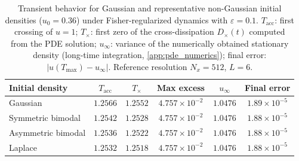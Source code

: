 \begin{table}[t]
\centering
\small
\caption{Transient behavior for Gaussian and representative non-Gaussian initial densities ($u_{0}=0.36$) under Fisher-regularized dynamics with $\varepsilon=0.1$. $T_{\mathrm{acc}}$: first crossing of $u=1$; $T_{\times}$: first zero of the cross-dissipation $D_{\times}(t)$ computed from the PDE solution; $u_{\infty}$: variance of the numerically obtained stationary density (long-time integration, \ref{app:pde_numerics}); final error: $|u(T_{\max})-u_{\infty}|$. Reference resolution $N_{x}=512$, $L=6$.}
\label{tab:nongaussian_results}
\begin{tabular}{lccccc}
\toprule
Initial density & $T_{\mathrm{acc}}$ & $T_{\times}$ & Max excess & $u_{\infty}$ & Final error \\
\midrule
Gaussian & $1.2566$ & $1.2552$ & $4.757{\times}10^{-2}$ & $1.0476$ & $1.89{\times}10^{-5}$ \\
Symmetric bimodal & $1.2542$ & $1.2528$ & $4.757{\times}10^{-2}$ & $1.0476$ & $1.88{\times}10^{-5}$ \\
Asymmetric bimodal & $1.2536$ & $1.2522$ & $4.757{\times}10^{-2}$ & $1.0476$ & $1.88{\times}10^{-5}$ \\
Laplace & $1.2532$ & $1.2518$ & $4.757{\times}10^{-2}$ & $1.0476$ & $1.88{\times}10^{-5}$ \\
\bottomrule
\end{tabular}
\end{table}
